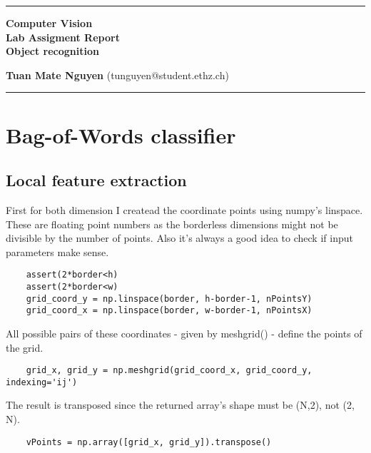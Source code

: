 \documentclass[10pt,a4paper,twoside]{article}
\begin{document}
\begin{center}
\hrule

\vspace{.4cm}
{\bf {\Huge Computer Vision} \\ {\huge Lab Assigment Report} \\ {\Large Object recognition}}
\vspace{.2cm}
\end{center}
{\bf Tuan Mate Nguyen}  (tunguyen@student.ethz.ch)
\hrule



\section{Bag-of-Words classifier}
\subsection{Local feature extraction}
First for both dimension I createad the coordinate points using numpy's linspace.
These are floating point numbers as the borderless dimensions might not be
divisible by the number of points. Also it's always a good idea to check if
input parameters make sense.

\begin{verbatim}
    assert(2*border<h)
    assert(2*border<w)
    grid_coord_y = np.linspace(border, h-border-1, nPointsY)
    grid_coord_x = np.linspace(border, w-border-1, nPointsX)
\end{verbatim}



All possible pairs of these coordinates -
given by meshgrid() - define the points of the grid. 

\begin{verbatim}
    grid_x, grid_y = np.meshgrid(grid_coord_x, grid_coord_y, indexing='ij')
\end{verbatim}

The result is transposed since the
returned array's shape must be (N,2), not (2, N).

\begin{verbatim}
    vPoints = np.array([grid_x, grid_y]).transpose()
\end{verbatim}
\end{document}
